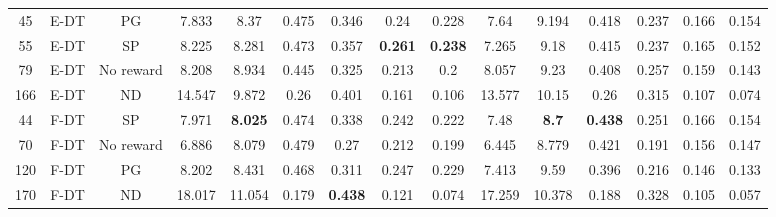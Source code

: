 \begin{table}
\begin{tabular}{@{\hskip3pt}c@{\hskip3pt}c@{\hskip3pt}c@{\hskip3pt}c@{\hskip3pt}c@{\hskip3pt}c@{\hskip3pt}c@{\hskip3pt}c@{\hskip3pt}c@{\hskip3pt}c@{\hskip3pt}c@{\hskip3pt}c@{\hskip3pt}c@{\hskip3pt}c@{\hskip3pt}c}
         45 &           E-DT &                   PG &             7.833 &            8.37 &          0.475 &           0.346 &            0.24 &           0.228 &                7.64 &         9.194 &           0.418 &           0.237 &           0.166 &          0.154 \\
         55 &           E-DT &                   SP &             8.225 &           8.281 &          0.473 &           0.357 &  \textbf{0.261} &  \textbf{0.238} &               7.265 &          9.18 &           0.415 &           0.237 &           0.165 &          0.152 \\
         79 &           E-DT &            No reward &             8.208 &           8.934 &          0.445 &           0.325 &           0.213 &             0.2 &               8.057 &          9.23 &           0.408 &           0.257 &           0.159 &          0.143 \\
        166 &           E-DT &                   ND &            14.547 &           9.872 &           0.26 &           0.401 &           0.161 &           0.106 &              13.577 &         10.15 &            0.26 &           0.315 &           0.107 &          0.074 \\
         44 &           F-DT &                   SP &             7.971 &  \textbf{8.025} &          0.474 &           0.338 &           0.242 &           0.222 &                7.48 &  \textbf{8.7} &  \textbf{0.438} &           0.251 &           0.166 &          0.154 \\
         70 &           F-DT &            No reward &             6.886 &           8.079 &          0.479 &            0.27 &           0.212 &           0.199 &               6.445 &         8.779 &           0.421 &           0.191 &           0.156 &          0.147 \\
        120 &           F-DT &                   PG &             8.202 &           8.431 &          0.468 &           0.311 &           0.247 &           0.229 &               7.413 &          9.59 &           0.396 &           0.216 &           0.146 &          0.133 \\
        170 &           F-DT &                   ND &            18.017 &          11.054 &          0.179 &  \textbf{0.438} &           0.121 &           0.074 &              17.259 &        10.378 &           0.188 &           0.328 &           0.105 &          0.057 \\
\bottomrule
\end{tabular}
\end{table}

